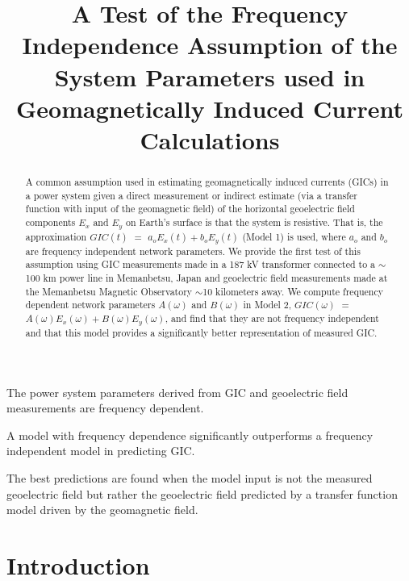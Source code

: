 \documentclass[draft,linenumbers]{agujournal2018}
\begin{document}
\title{A Test of the Frequency Independence Assumption of the System Parameters used in Geomagnetically Induced Current Calculations}





\begin{keypoints}
\item The power system parameters derived from GIC and geoelectric field measurements are frequency dependent.
\item A model with frequency dependence significantly outperforms a frequency independent model in predicting GIC.
\item The best predictions are found when the model input is not the measured geoelectric field but rather the geoelectric field predicted by a transfer function model driven by the geomagnetic field.
\end{keypoints}

\begin{abstract}
A common assumption used in estimating geomagnetically induced currents (GICs) in a power system given a direct measurement or indirect estimate (via a transfer function with input of the geomagnetic field) of the horizontal geoelectric field components $E_x$ and $E_y$ on Earth's surface is that the system is resistive. That is, the approximation $GIC(t)$  $=$ $a_oE_x(t) + b_oE_y(t)$ (Model 1) is used, where $a_o$ and $b_o$ are frequency independent network parameters.  We provide the first test of this assumption using GIC measurements made in a 187 kV transformer connected to a $\sim$100 km power line in Memanbetsu, Japan and geoelectric field measurements made at the Memanbetsu Magnetic Observatory $\sim$10 kilometers away.  We compute frequency dependent network parameters  $A(\omega)$ and $B(\omega)$ in Model 2, $GIC(\omega)$ $=$ $A(\omega)E_x(\omega) + B(\omega)E_y(\omega)$, and find that they are not frequency independent and that this model provides a significantly better representation of measured GIC.
\end{abstract}

\section{Introduction}
\end{document}
